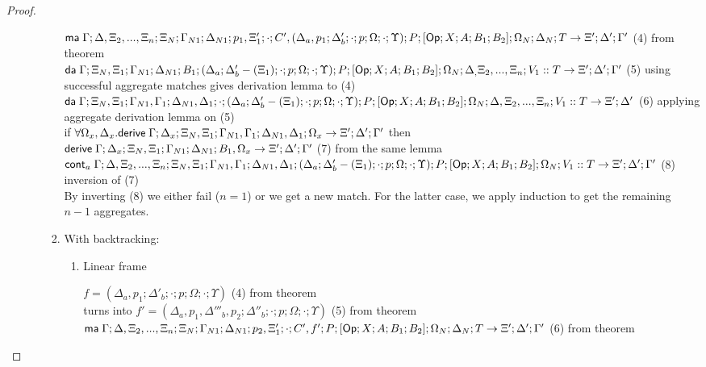 \begin{proof}
\begin{enumerate}
\begin{itemize}
\begin{enumerate}
            $\mathsf{ma} \; \Gamma; \Delta, \Xi_2, ..., \Xi_n; \Xi_N; \Gamma_{N1}; \Delta_{N1}; p_1, \Xi'_1; \cdot; C', (\Delta_a, p_1; \Delta'_b; \cdot; p; \Omega; \cdot; \Upsilon); P; [\mathsf{Op} ; X ; A ; B_1; B_2]; \Omega_N; \Delta_N; T \rightarrow \Xi'; \Delta'; \Gamma'$ \hfill (4) from theorem \\
            $\mathsf{da} \; \Gamma; \Xi_N, \Xi_1; \Gamma_{N1}; \Delta_{N1}; B_1; (\Delta_a; \Delta'_b - (\Xi_1); \cdot; p; \Omega; \cdot; \Upsilon); P; [\mathsf{Op} ; X ; A ; B_1; B_2]; \Omega_N; \Delta_, \Xi_2, ..., \Xi_n; V_1 :: T \rightarrow \Xi'; \Delta'; \Gamma'$ \hfill (5) using successful aggregate matches gives derivation lemma to (4) \\
              $\mathsf{da} \; \Gamma; \Xi_N, \Xi_1; \Gamma_{N1}, \Gamma_1; \Delta_{N1}, \Delta_1; \cdot; (\Delta_a; \Delta'_b - (\Xi_1); \cdot; p; \Omega; \cdot; \Upsilon); P; [\mathsf{Op} ; X ; A ; B_1; B_2]; \Omega_N; \Delta, \Xi_2, ..., \Xi_n; V_1 :: T \rightarrow \Xi'; \Delta'$ \hfill (6) applying aggregate derivation lemma on (5) \\
              if $\forall \Omega_x, \Delta_x. \mathsf{derive} \; \Gamma; \Delta_x; \Xi_N, \Xi_1; \Gamma_{N1}, \Gamma_1; \Delta_{N1}, \Delta_1; \Omega_x \rightarrow \Xi'; \Delta'; \Gamma'$ then \\
              $\mathsf{derive} \; \Gamma; \Delta_x; \Xi_N, \Xi_1; \Gamma_{N1}; \Delta_{N1}; B_1, \Omega_x \rightarrow \Xi'; \Delta'; \Gamma'$ \hfill (7) from the same lemma \\
              $\mathsf{cont}_a \; \Gamma; \Delta, \Xi_2, ..., \Xi_n; \Xi_N, \Xi_1; \Gamma_{N1}, \Gamma_1; \Delta_{N1}, \Delta_1; (\Delta_a; \Delta'_b - (\Xi_1); \cdot; p; \Omega; \cdot; \Upsilon); P; [\mathsf{Op} ; X ; A ; B_1; B_2]; \Omega_N; V_1 :: T \rightarrow \Xi'; \Delta'; \Gamma'$ \hfill (8) inversion of (7) \\
              
              By inverting (8) we either fail ($n = 1$) or we get a new match. For the latter case, we apply induction to get the remaining $n - 1$ aggregates.
            
            \item With backtracking:
            
            \begin{enumerate}
               \item Linear frame
               
               $f = (\Delta_a, p_1; \Delta'_b; \cdot; p; \Omega; \cdot; \Upsilon)$ \hfill (4) from theorem \\
               turns into $f' = (\Delta_a, p_1, \Delta'''_b, p_2; \Delta''_b; \cdot; p; \Omega; \cdot; \Upsilon)$ \hfill (5) from theorem \\
               $\mathsf{ma} \; \Gamma; \Delta, \Xi_2, ..., \Xi_n; \Xi_N; \Gamma_{N1}; \Delta_{N1}; p_2, \Xi'_1; \cdot; C', f'; P; [\mathsf{Op} ; X ; A ; B_1; B_2]; \Omega_N; \Delta_N; T \rightarrow \Xi'; \Delta'; \Gamma'$ \hfill (6) from theorem \\
               

\end{enumerate}
\end{enumerate}
\end{itemize}
\end{enumerate}
\end{proof}
